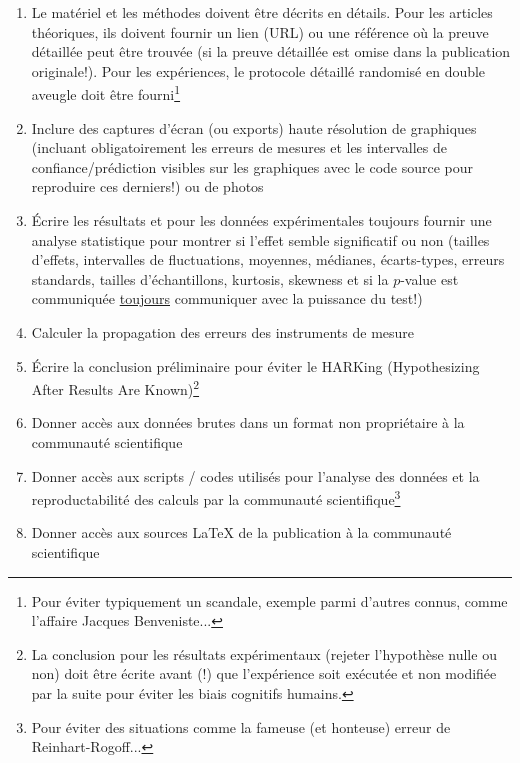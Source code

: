 \begin{enumerate}[label=\protect\circledbullet{\arabic*},leftmargin=15mm]
		\item Le mat\'eriel et les m\'ethodes doivent être d\'ecrits en d\'etails. Pour les articles th\'eoriques, ils doivent fournir un lien (URL) ou une r\'ef\'erence où la preuve d\'etaill\'ee peut être trouv\'ee (si la preuve d\'etaill\'ee est omise dans la publication originale!). Pour les exp\'eriences, le protocole d\'etaill\'e randomis\'e en double aveugle doit être fourni\footnote{Pour \'eviter typiquement un scandale, exemple parmi d'autres connus, comme l'affaire Jacques Benveniste...}
		
		\item Inclure des captures d'\'ecran (ou exports) haute r\'esolution de graphiques (incluant obligatoirement les erreurs de mesures et les intervalles de confiance/pr\'ediction visibles sur les graphiques avec le code source pour reproduire ces derniers!) ou de photos
		
		\item \'Ecrire les r\'esultats et pour les donn\'ees exp\'erimentales toujours fournir une analyse statistique pour montrer si l'effet semble significatif ou non (tailles d'effets, intervalles de fluctuations, moyennes, m\'edianes, \'ecarts-types, erreurs standards, tailles d'\'echantillons, kurtosis, skewness et si la $p$-value est communiqu\'ee \underline{toujours} communiquer avec la puissance du test!)
		
		\item Calculer la propagation des erreurs des instruments de mesure
		
		\item \'Ecrire la conclusion pr\'eliminaire pour éviter le HARKing (Hypothesizing After Results Are Known)\footnote{La conclusion pour les r\'esultats exp\'erimentaux (rejeter l'hypothèse nulle ou non) doit être \'ecrite avant (!) que l'exp\'erience soit ex\'ecut\'ee et non modifi\'ee par la suite pour \'eviter les biais cognitifs humains.}
		
		\item Donner accès aux donn\'ees brutes dans un format non propri\'etaire à la communaut\'e scientifique
		
		\item Donner accès aux scripts / codes utilis\'es pour l'analyse des donn\'ees et la reproductabilit\'e des calculs par la communaut\'e scientifique\footnote{Pour éviter des situations comme la fameuse (et honteuse) erreur de Reinhart-Rogoff...}
		
		\item Donner accès aux sources \LaTeX{} de la publication à la communaut\'e scientifique
		

\end{enumerate}
